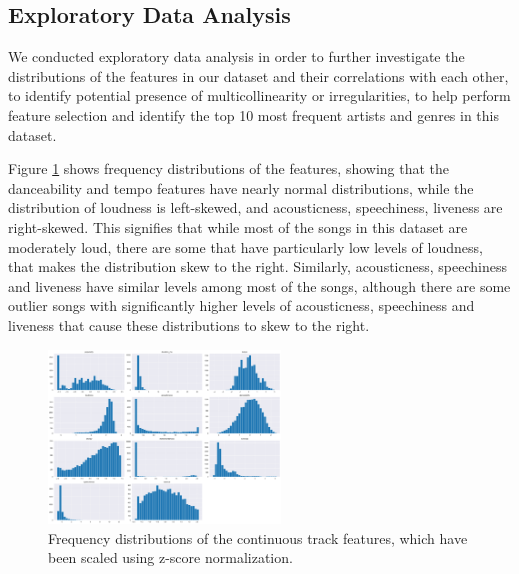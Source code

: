 \documentclass[times, twocolumn]{article}
\begin{document}
\subsection{Exploratory Data Analysis}
We conducted exploratory data analysis in order to further investigate the distributions of the features in our dataset and their correlations with each other, to identify potential presence of multicollinearity or irregularities, to help perform feature selection and identify the top 10 most frequent artists and genres in this dataset.

Figure \ref{graph:dists} shows frequency distributions of the features, showing that the danceability and tempo features have nearly normal distributions, while the distribution of loudness is left-skewed, and acousticness, speechiness, liveness are right-skewed. This signifies that while most of the songs in this dataset are moderately loud, there are some that have particularly low levels of loudness, that makes the distribution skew to the right. Similarly, acousticness, speechiness and liveness have similar levels among most of the songs, although there are some outlier songs with significantly higher levels of acousticness, speechiness and liveness that cause these distributions to skew to the right.

\begin{figure}[H]
    \centering
    \includegraphics[width=0.55\textwidth]{feature_dists.png}
    \caption{Frequency distributions of the continuous track features, which have been scaled using z-score normalization.}
    \label{graph:dists}
\end{figure}
\end{document}

